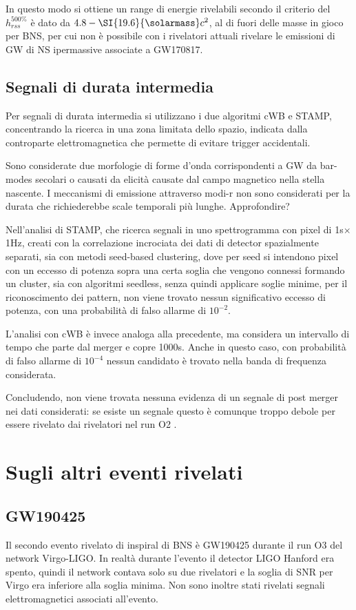 In questo modo si ottiene un range di energie rivelabili secondo il criterio del $h_{rss}^{500\%}$ è dato da $4.8-\SI{19.6}{\solarmass}c^2$, al di fuori delle masse in gioco per BNS, per cui non è possibile con i rivelatori attuali rivelare le emissioni di GW di NS ipermassive associate a GW170817.
\subsection{Segnali di durata intermedia}
Per segnali di durata intermedia si utilizzano i due algoritmi cWB e STAMP, concentrando la ricerca in una zona limitata dello spazio, indicata dalla controparte elettromagnetica che permette di evitare trigger accidentali.

Sono considerate due morfologie di forme d'onda corrispondenti a GW da bar-modes secolari o causati da elicità causate dal campo magnetico nella stella nascente. I meccanismi di emissione attraverso modi-r non sono considerati per la durata che richiederebbe scale temporali più lunghe.
Approfondire?

Nell'analisi di STAMP, che ricerca segnali in uno spettrogramma con pixel di 1s$\times$1Hz, creati con la correlazione incrociata dei dati di detector spazialmente separati, sia con metodi seed-based clustering, dove per seed si intendono pixel con un eccesso di potenza sopra una certa soglia che vengono connessi formando un cluster, sia con algoritmi seedless, senza quindi applicare soglie minime, per il riconoscimento dei pattern, non viene trovato nessun significativo eccesso di potenza, con una probabilità di falso allarme di $10^{-2}$.

L'analisi con cWB è invece analoga alla precedente, ma considera un intervallo di tempo che parte dal merger e copre 1000s. Anche in questo caso, con probabilità di falso allarme di $10^{-4}$ nessun candidato è trovato nella banda di frequenza considerata.

Concludendo, non viene trovata nessuna evidenza di un segnale di post merger nei dati considerati: se esiste un segnale questo è comunque troppo debole per essere rivelato dai rivelatori nel run O2 \cite{Abbott_2017b}.

\section{Sugli altri eventi rivelati}
\subsection*{GW190425}
Il secondo evento rivelato di inspiral di BNS è GW190425 durante il run O3 del network Virgo-LIGO. In realtà durante l'evento il detector LIGO Hanford era spento, quindi il network contava solo su due rivelatori e la soglia di SNR per Virgo era inferiore alla soglia minima. Non sono inoltre stati rivelati segnali elettromagnetici associati all'evento.

